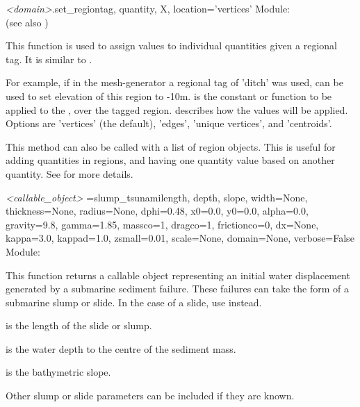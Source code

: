 \documentclass{manual}
\begin{document}
\begin{methoddesc}{\emph{<domain>}.set_region}{tag, quantity, X, location='vertices'}
Module:  \\
(see also )

This function is used to assign values to individual quantities given
a regional tag.   It is similar to .

For example, if in the mesh-generator a regional tag of 'ditch' was
used,  can be used to set elevation of this region to
-10m.  is the constant or function to be applied to the ,
over the tagged region.   describes how the values will be
applied.  Options are 'vertices' (the default), 'edges', 'unique
vertices', and 'centroids'.

This method can also be called with a list of region objects.  This is
useful for adding quantities in regions, and having one quantity
value based on another quantity. See   for
more details.
\end{methoddesc}

\begin{funcdesc}{\emph{<callable_object>} =slump_tsunami}{length, depth, slope, width=None, thickness=None,
                                radius=None, dphi=0.48, x0=0.0, y0=0.0, alpha=0.0,
                                gravity=9.8, gamma=1.85,
                                massco=1, dragco=1, frictionco=0,
                                dx=None, kappa=3.0, kappad=1.0, zsmall=0.01, scale=None,
                                domain=None,
                                verbose=False}
Module: 

This function returns a callable object representing an initial water
displacement generated by a submarine sediment failure. These failures can take the form of
a submarine slump or slide. In the case of a slide, use  instead.

 is the length of the slide or slump.

 is the water depth to the centre of the sediment mass.

 is the bathymetric slope.

Other slump or slide parameters can be included if they are known.
\end{funcdesc}
\end{document}
